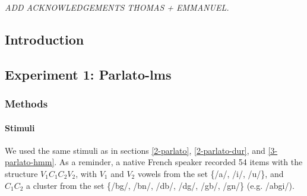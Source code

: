 \small{\textit{{\color{red}ADD ACKNOWLEDGEMENTS THOMAS + EMMANUEL.\\}}}

\subsection{Introduction}
\subsection{Experiment 1: {\color{red}Parlato-lms}}
\subsubsection{Methods}
\paragraph{Stimuli}
We used the same stimuli as in sections \ref{2-parlato}, \ref{2-parlato-dur}, and \ref{3-parlato-hmm}. As a reminder, a native French speaker recorded 54 items with the structure $V_{1}C_{1}C_{2}V_{2}$, with $V_{1}$ and $V_{2}$ vowels from the set \{/a/, /i/, /u/\}, and $C_{1}C_{2}$ a cluster from the set \{/bg/, /bn/, /db/, /dg/, /gb/, /gn/\} (e.g. /abgi/).

